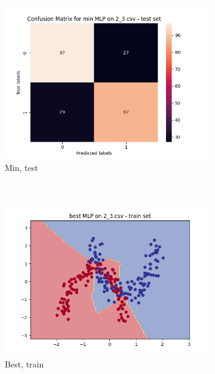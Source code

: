 \documentclass[12pt]{article}
\newcommand*{\subfigwidth}{0.24\textwidth}
\begin{document}
\begin{figure}[H]
\begin{subfigure}[t]{\subfigwidth}
        \includegraphics[width=\linewidth]{img/exp_2/mlp/2_3/min/test_matrix.png}
        \caption{Min, test}
    \end{subfigure} 
    \\
    \begin{subfigure}[t]{\subfigwidth}
        \includegraphics[width=\linewidth]{img/exp_2/mlp/2_3/best/train_boundary.png}
        \caption{Best, train}
    \end{subfigure}
    \hfill
    \begin{subfigure}[t]{\subfigwidth}

\end{subfigure}
\end{figure}
\end{document}
